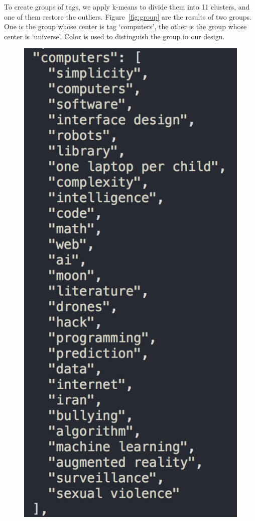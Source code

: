 \documentclass{report}
\numberwithin{figure}{section}
\begin{document}
\quad To create groups of tags, we apply k-means to divide them into 11 clusters, and one of them restore the outliers. Figure~\ref{fig:group} are the results of two groups. One is the group whose center is tag `computers', the other is the group whose center is `universe'. Color is used to distinguish the group in our design.
\begin{figure} [h]
\begin{center}
\includegraphics[scale=0.5]{computersgroup}

\end{center}
\end{figure}
\end{document}
